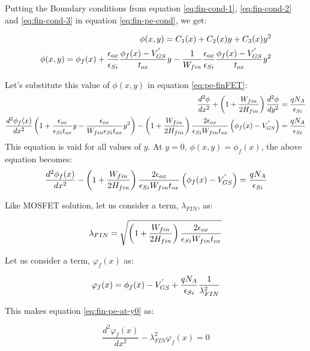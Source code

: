 \documentclass[a4paper]{article}
\begin{document}
Putting the Boundary conditions from equation \ref{eq:fin-cond-1}, \ref{eq:fin-cond-2} and \ref{eq:fin-cond-3} in equation \ref{eq:fin-pe-cond}, we get:

\begin{align*}
  \phi(x,y) = C_1(x) + C_2(x)y  + C_3(x)y^2\\
  \phi(x,y) = \phi_f(x) + \frac {\epsilon_{ox}} {\epsilon_{Si}} \frac{\phi_f(x) - V_{GS}^{'}}{t_{ox}} y -  \frac{1}{W_{fin}} \frac {\epsilon_{ox}} {\epsilon_{Si}} \frac{\phi_f(x) - V_{GS}^{'}}{t_{ox}} y^2
\end{align*}

Let's substitute this value of $\phi(x,y)$ in equation \ref{eq:pe-finFET}:
\begin{align*}
    \frac {d^2\phi} {dx^2} + \left( 1 + \frac{W_{fin}} {2 H_{fin}} \right) \frac {d^2\phi} {dy^2} = \frac{qN_A} {\epsilon_{Si}}\\
    \frac{d^2\phi_f(x)}{dx^2} \left(1 + \frac{\epsilon_{ox}}{\epsilon_{Si}t_{ox}}y - \frac{\epsilon_{ox}}{W_{fin} \epsilon_{Si}t_{ox}}y^2\right) - \left( 1 + \frac{W_{fin}}{2 H_{fin}} \right) \frac{2 \epsilon_{ox}}{\epsilon_{Si}W_{fin} t_{ox}}\left( \phi_f(x) - V_{GS}^{'}\right) = \frac{qN_A} {\epsilon_{Si}}
\end{align*}
This equation is vaid for all values of $y$. At $y=0$, $\phi(x,y)=\phi_f(x)$, the above equation becomes:
\begin{equation}
  \label{eq:fin-pe-at-y0}
  \frac{d^2\phi_f(x)}{dx^2} - \left( 1 + \frac{W_{fin}}{2 H_{fin}} \right) \frac{2 \epsilon_{ox}}{\epsilon_{Si}W_{fin} t_{ox}}\left( \phi_f(x) - V_{GS}^{'}\right) = \frac{qN_A} {\epsilon_{Si}}
\end{equation}

Like MOSFET solution, let us consider a term, $\lambda_{FIN}$, as:

\begin{equation}
  \lambda_{FIN} = \sqrt {\left( 1 + \frac{W_{fin}}{2 H_{fin}} \right) \frac{2 \epsilon_{ox}}{\epsilon_{Si}W_{fin} t_{ox}}}
\end{equation}

Let us consider a term, $\varphi_f(x)$ as:

\begin{equation}
  \varphi_f(x) = \phi_f(x) - V_{GS}^{'} + \frac{qN_A} {\epsilon_{Si}} \frac{1}{\lambda_{FIN}^2}
\end{equation}

This makes equation \ref{eq:fin-pe-at-y0} as:

\begin{equation}
  \label{eq:varphi-fin}
  \frac{d^2\varphi_f(x)}{dx^2} - \lambda_{FIN}^2\varphi_f(x) = 0
\end{equation}
\end{document}
